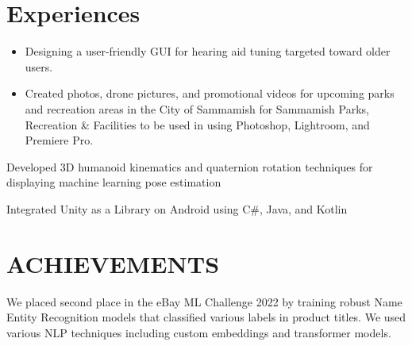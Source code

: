 \documentclass[]{main}
\begin{document}
\begin{minipage}[t]{0.66\textwidth} 


\section{Experiences}
\begin{itemize}
\item Designing a user-friendly GUI for hearing aid tuning targeted toward older users.
\end{itemize}

\begin{itemize}
\item Created photos, drone pictures, and promotional videos for upcoming parks and recreation areas in the City of Sammamish for Sammamish Parks, Recreation \& Facilities to be used in using Photoshop, Lightroom, and Premiere Pro.
\end{itemize}

\begin{tightemize}
\item Developed 3D humanoid kinematics and quaternion rotation techniques
for displaying machine learning pose estimation
\item Integrated Unity as a Library on Android using C\#, Java, and Kotlin
\end{tightemize}
\sectionsep



\section{ACHIEVEMENTS}

We placed second place in the eBay ML Challenge 2022 by training robust Name Entity Recognition models that classified various labels in product titles. We used various NLP techniques including custom embeddings and transformer models.
\sectionsep


\end{minipage}
\end{document}
